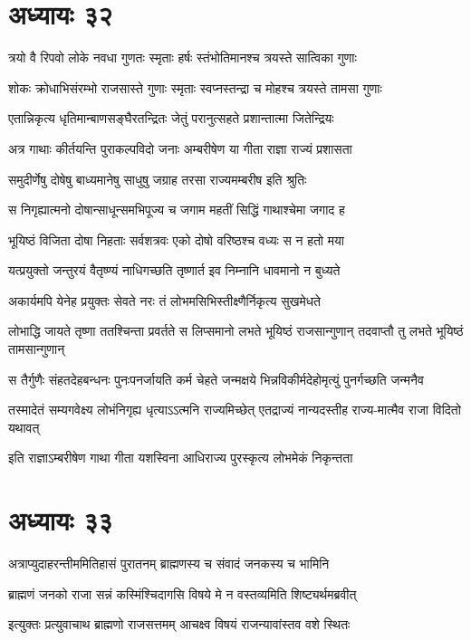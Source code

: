\chapter{अध्यायः ३२}
\twolineshloka
{त्रयो वै रिपवो लोके नवधा गुणतः स्मृताः}
{हर्षः स्तंभोतिमानश्च त्रयस्ते सात्विका गुणाः}


\twolineshloka
{शोकः क्रोधाभिसंरम्भो राजसास्ते गुणाः स्मृताः}
{स्वप्नस्तन्द्रा च मोहश्च त्रयस्ते तामसा गुणाः}


\twolineshloka
{एतान्निकृत्य धृतिमान्बाणसङ्घैरतन्द्रितः}
{जेतुं परानुत्सहते प्रशान्तात्मा जितेन्द्रियः}


\twolineshloka
{अत्र गाथाः कीर्तयन्ति पुराकल्पविदो जनाः}
{अम्बरीषेण या गीता राज्ञा राज्यं प्रशासता}


\twolineshloka
{समुदीर्णेषु दोषेषु बाध्यमानेषु साधुषु}
{जग्राह तरसा राज्यमम्बरीष इति श्रुतिः}


\twolineshloka
{स निगृह्यात्मनो दोषान्साधून्समभिपूज्य च}
{जगाम महतीं सिद्धिं गाथाश्चेमा जगाद ह}


\twolineshloka
{भूयिष्ठं विजिता दोषा निहताः सर्वशत्रवः}
{एको दोषो वरिष्ठश्च वध्यः स न हतो मया}


\twolineshloka
{यत्प्रयुक्तो जन्तुरयं वैतृष्ण्यं नाधिगच्छति}
{तृष्णार्त इव निम्नानि धावमानो न बुध्यते}


\twolineshloka
{अकार्यमपि येनेह प्रयुक्तः सेवते नरः}
{तं लोभमसिभिस्तीक्ष्णैर्निकृत्य सुखमेधते}


\threelineshloka
{लोभाद्धि जायते तृष्णा ततश्चिन्ता प्रवर्तते}
{स लिप्समानो लभते भूयिष्ठं राजसान्गुणान्}
{तदवाप्तौ तु लभते भूयिष्ठं तामसान्गुणान्}


\threelineshloka
{स तैर्गुणैः संहतदेहबन्धनः}
{पुनःपनर्जायति कर्म चेहते}
{जन्मक्षये भिन्नविकीर्मदेहोमृत्युं पुनर्गच्छति जन्मनैव}


\twolineshloka
{तस्मादेतं सम्यगवेक्ष्य लोभंनिगृह्य धृत्याऽऽत्मनि राज्यमिच्छेत्}
{एतद्राज्यं नान्यदस्तीह राज्य-मात्मैव राजा विदितो यथावत्}


\twolineshloka
{इति राज्ञाऽम्बरीषेण गाथा गीता यशस्विना}
{आधिराज्य पुरस्कृत्य लोभमेकं निकृन्तता}


\chapter{अध्यायः ३३}
\twolineshloka
{अत्राप्युदाहरन्तीममितिहासं पुरातनम्}
{ब्राह्मणस्य च संवादं जनकस्य च भामिनि}


\twolineshloka
{ब्राह्मणं जनको राजा सन्नं कस्मिंश्चिदागसि}
{विषये मे न वस्तव्यमिति शिष्ट्यर्थमब्रवीत्}


\twolineshloka
{इत्युक्तः प्रत्युवाचाथ ब्राह्मणो राजसत्तमम्}
{आचक्ष्व विषयं राजन्यावांस्तव वशे स्थितः}


